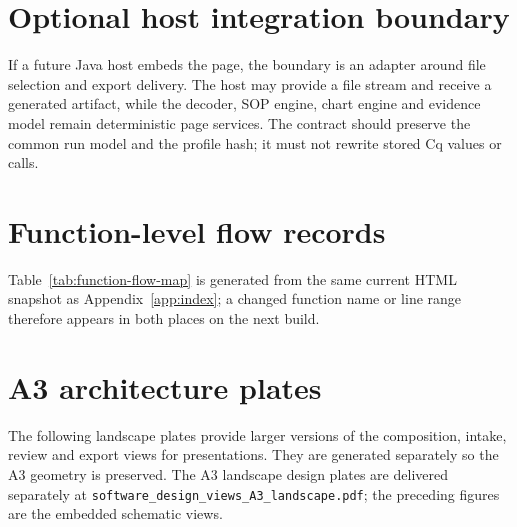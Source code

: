 \section{Optional host integration boundary}
If a future Java host embeds the page, the boundary is an adapter around file selection and export delivery. The host may provide a file stream and receive a generated artifact, while the decoder, SOP engine, chart engine and evidence model remain deterministic page services. The contract should preserve the common run model and the profile hash; it must not rewrite stored Cq values or calls.

\section{Function-level flow records}
Table~\ref{tab:function-flow-map} is generated from the same current HTML snapshot as Appendix~\ref{app:index}; a changed function name or line range therefore appears in both places on the next build.


\section{A3 architecture plates}
The following landscape plates provide larger versions of the composition, intake, review and export views for presentations. They are generated separately so the A3 geometry is preserved.
The A3 landscape design plates are delivered separately at \texttt{software\_design\_views\_A3\_landscape.pdf}; the preceding figures are the embedded schematic views.

